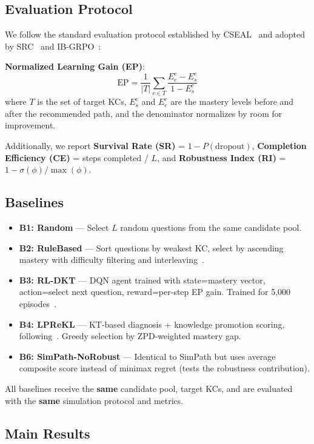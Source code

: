 \documentclass[runningheads]{llncs}
\begin{document}
\subsection{Evaluation Protocol}

We follow the standard evaluation protocol established by CSEAL~\cite{cseal2019} and adopted by SRC~\cite{src2023} and IB-GRPO~\cite{ibgrpo2026}:

\textbf{Normalized Learning Gain (EP)}:
\begin{equation}
\text{EP} = \frac{1}{|T|} \sum_{c \in T} \frac{E_e^c - E_s^c}{1 - E_s^c}
\end{equation}
where $T$ is the set of target KCs, $E_s^c$ and $E_e^c$ are the mastery levels before and after the recommended path, and the denominator normalizes by room for improvement.

Additionally, we report \textbf{Survival Rate (SR)} = $1 - P(\text{dropout})$, \textbf{Completion Efficiency (CE)} = steps completed / $L$, and \textbf{Robustness Index (RI)} = $1 - \sigma(\phi) / \max(\phi)$.

\subsection{Baselines}

\begin{itemize}
\item \textbf{B1: Random} --- Select $L$ random questions from the same candidate pool.
\item \textbf{B2: RuleBased} --- Sort questions by weakest KC, select by ascending mastery with difficulty filtering and interleaving~\cite{src2023}.
\item \textbf{B3: RL-DKT} --- DQN agent trained with state=mastery vector, action=select next question, reward=per-step EP gain. Trained for 5,000 episodes~\cite{cseal2019}.
\item \textbf{B4: LPReKL} --- KT-based diagnosis + knowledge promotion scoring, following~\cite{lprekl2025}. Greedy selection by ZPD-weighted mastery gap.
\item \textbf{B6: SimPath-NoRobust} --- Identical to SimPath but uses average composite score instead of minimax regret (tests the robustness contribution).
\end{itemize}

All baselines receive the \textbf{same} candidate pool, target KCs, and are evaluated with the \textbf{same} simulation protocol and metrics.

\subsection{Main Results}
\end{document}

